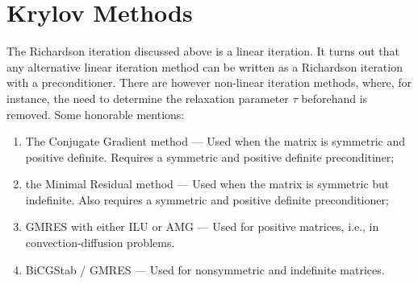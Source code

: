 \section{Krylov Methods}
\label{sec:krylov_methods}

The Richardson iteration discussed above is a linear iteration. It turns out
that any alternative linear iteration method can be written as a Richardson
iteration with a preconditioner. There are however non-linear iteration
methods, where, for instance, the need to determine the relaxation parameter \(
\tau \) beforehand is removed. Some honorable mentions:
\begin{enumerate}
    \item The Conjugate Gradient method --- Used when the matrix is symmetric
        and positive definite. Requires a symmetric and positive definite
        preconditiner;
    \item the Minimal Residual method --- Used when the matrix is symmetric but
        indefinite. Also requires a symmetric and positive definite
        preconditioner; 
    \item GMRES with either ILU or AMG --- Used for positive matrices, i.e., in
        convection-diffusion problems.
    \item BiCGStab / GMRES --- Used for nonsymmetric and indefinite matrices.
\end{enumerate}
